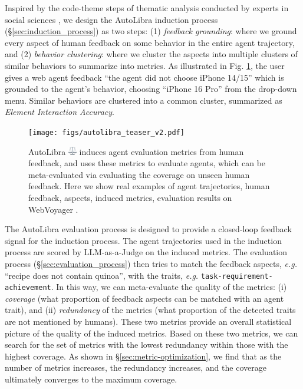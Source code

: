 Inspired by the code-theme steps of thematic analysis conducted by experts in
social sciences \citep{braun2006using}, we design the AutoLibra induction
process (\S\ref{sec:induction_process}) as two steps: (1) \emph{feedback
grounding}: where we ground every aspect of human feedback on some behavior in
the entire agent trajectory, and (2) \emph{behavior clustering}: where we cluster
the aspects into multiple clusters of similar behaviors to summarize into metrics.
As illustrated in Fig. \ref{fig:teaser}, the user gives a web agent feedback ``the
agent did not choose iPhone 14/15'' which is grounded to the agent's behavior, choosing
``iPhone 16 Pro'' from the drop-down menu. Similar behaviors are clustered into
a common cluster, summarized as \textit{Element Interaction Accuracy}.

\begin{figure}[!t]
	\centering
	\texttt{[image: figs/autolibra\_teaser\_v2.pdf]}
	\caption{AutoLibra \protect
	\includegraphics[height=1em]{figs/scale.png}
	induces agent evaluation metrics from human feedback, and uses these metrics to
	evaluate agents, which can be meta-evaluated via evaluating the coverage on
	unseen human feedback. Here we show real examples of agent trajectories, human
	 feedback, aspects, induced metrics, evaluation results on WebVoyager \citep{he2024webvoyager}. 
    }
	\label{fig:teaser}
\end{figure}

The AutoLibra evaluation process is designed to provide a closed-loop feedback signal
for the induction process. The agent trajectories used in the induction process
are scored by LLM-as-a-Judge \citep{zheng2023judging} on the induced metrics.
The evaluation process (\S\ref{sec:evaluation_process}) then tries to match the feedback
aspects, \emph{e.g.} ``recipe does not contain quinoa'', with the traits, \emph{e.g.}
\texttt{task-requirement-achievement}. In this way, we can meta-evaluate the quality
of the metrics: (i) \emph{coverage} (what proportion of feedback aspects can be
matched with an agent trait), and (ii) \emph{redundancy} of the metrics (what
proportion of the detected traits are not mentioned by humans). These two
metrics provide an overall statistical picture of the quality of the induced
metrics. Based on these two metrics, we can search for the set of metrics with
the lowest redundancy within those with the highest coverage. As shown in \S\ref{sec:metric-optimization},
we find that as the number of metrics increases, the redundancy increases, and the
coverage ultimately converges to the maximum coverage.

